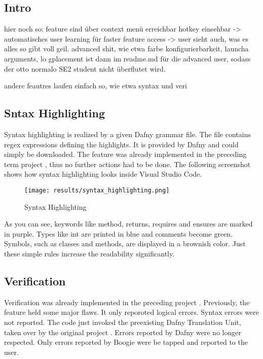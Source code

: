 \subsection{Intro}
hier noch so:
feature sind über context menü erreichbar
hotkey einsehbar -> automatisches user learning für faster feature access
-> user sieht auch, was es alles so gibt
voll geil.
advanced shit, wie etwa farbe konfigurierbarkeit, launcha arguments, lo gplacement ist dann im readme.md für die advanced user, sodass der otto normalo SE2 student nicht überflutet wird.

andere feautres laufen einfach so, wie etwa syntax und veri

\subsection{Sntax Highlighting}
\label{section:result_syntaxhighgliht}
Syntax highlighting is realized by a given Dafny grammar file.
The file contains regex expressions defining the highlights.
It is provided by Dafny  and could simply be downloaded.
The feature was already implemented in the preceding term project \cite{sa}, thus no further actions had to be done.
The following screenshot shows how syntax highlighting looks inside Visual Studio Code.

\begin{figure}[H]
    \centering
    \texttt{[image: results/syntax\_highlighting.png]}
    \caption{Syntax Highlighting}
    \label{fig:result_syntax_highlight}
\end{figure}

As you can see, keywords like method, returns, requires and ensures are marked in purple.
Types like int are printed in blue and comments become green. Symbols, such as classes and
methods, are displayed in a brownish color. Just these simple rules increase the readability
significantly.


\subsection{Verification}
Verification was already implemented in the preceding project \cite{sa}.
Previously, the feature held some major flaws.
It only reporoted logical errors.
Syntax errors were not reported.
The code just invoked the preexisting Dafny Translation Unit, taken over by the original project \cite{ba}.
Errors reported by Dafny were no longer respected.
Only errors reported by Boogie were be tapped and reported to the user.

